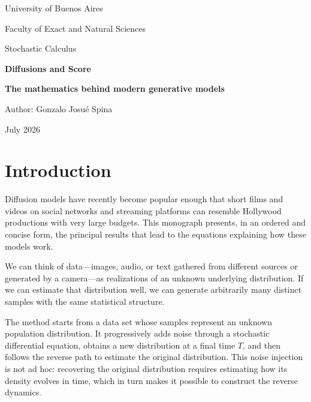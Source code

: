 \documentclass[12pt,a4paper]{report}
\theoremstyle{plain}
\theoremstyle{definition}
\begin{document}
\begin{titlepage}\centering\vspace*{2cm}
{\Large University of Buenos Aires\par}\vspace{.5cm}
{\large Faculty of Exact and Natural Sciences\par}
{\large Stochastic Calculus\par}\vspace{3cm}
{\Huge\bfseries Diffusions and Score\par}\vspace{.3cm}
{\Large\bfseries The mathematics behind modern generative models\par}\vspace{2cm}
{\large Author: Gonzalo Josué Spina\par}\vfill{\large July 2026\par}
\end{titlepage}
\clearpage\tableofcontents\clearpage

\chapter{Introduction}\label{chap:introduction}
Diffusion models have recently become popular enough that short films and videos on social networks and streaming platforms can resemble Hollywood productions with very large budgets. This monograph presents, in an ordered and concise form, the principal results that lead to the equations explaining how these models work.

We can think of data---images, audio, or text gathered from different sources or generated by a camera---as realizations of an unknown underlying distribution. If we can estimate that distribution well, we can generate arbitrarily many distinct samples with the same statistical structure.

The method starts from a data set whose samples represent an unknown population distribution. It progressively adds noise through a stochastic differential equation, obtains a new distribution at a final time $T$, and then follows the reverse path to estimate the original distribution. This noise injection is not ad hoc: recovering the original distribution requires estimating how its density evolves in time, which in turn makes it possible to construct the reverse dynamics.
\end{document}
